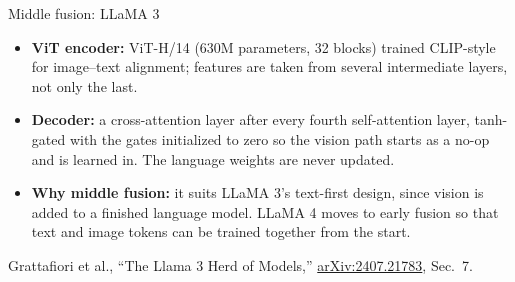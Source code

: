 \begin{frame}[t]{Middle fusion: LLaMA 3}
  \begin{itemize}\itemsep0.4em
    \item \textbf{ViT encoder:} ViT-H/14 (630M parameters, 32 blocks) trained CLIP-style for image--text alignment; features are taken from several intermediate layers, not only the last.
    \item \textbf{Decoder:} a cross-attention layer after every fourth self-attention layer, tanh-gated with the gates initialized to zero so the vision path starts as a no-op and is learned in. The language weights are never updated.
    \item \textbf{Why middle fusion:} it suits LLaMA 3's text-first design, since vision is added to a finished language model. LLaMA 4 moves to early fusion so that text and image tokens can be trained together from the start.
  \end{itemize}
  \vfill
  {\scriptsize Grattafiori et al., ``The Llama 3 Herd of Models,'' \href{https://arxiv.org/abs/2407.21783}{arXiv:2407.21783}, Sec.~7.}
\end{frame}
